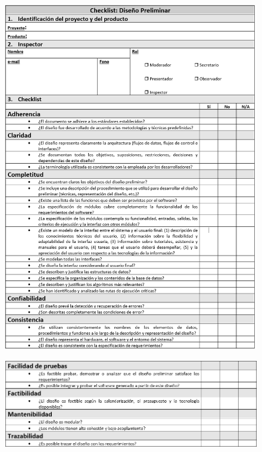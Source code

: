 \begin{figure}[H]
\centering
\includegraphics[width=1\textwidth]{figures/anexos/3-2-3a.PNG}
\end{figure}

\begin{figure}[H]
\centering
\includegraphics[width=1\textwidth]{figures/anexos/3-2-3b.PNG}
\end{figure}

